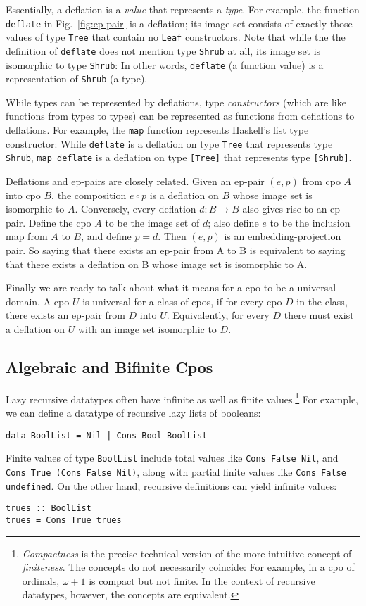 \documentclass{llncs}
\begin{document}
Essentially, a deflation is a \emph{value} that represents a
\emph{type}.  For example, the function \texttt{deflate} in
Fig.~\ref{fig:ep-pair} is a deflation; its image set consists of
exactly those values of type \texttt{Tree} that contain no
\texttt{Leaf} constructors.  Note that while the the definition of
\texttt{deflate} does not mention type \texttt{Shrub} at all, its
image set is isomorphic to type \texttt{Shrub}: In other words,
\texttt{deflate} (a function value) is a representation of
\texttt{Shrub} (a type).

While types can be represented by deflations, type \emph{constructors}
(which are like functions from types to types) can be represented as
functions from deflations to deflations.  For example, the
\texttt{map} function represents Haskell's list type constructor:
While \texttt{deflate} is a deflation on type \texttt{Tree} that
represents type \texttt{Shrub}, \texttt{map deflate} is a deflation on
type \texttt{[Tree]} that represents type \texttt{[Shrub]}.

Deflations and ep-pairs are closely related.  Given an ep-pair $(e, p)$
from cpo $A$ into cpo $B$, the composition $e \circ p$ is a deflation
on $B$ whose image set is isomorphic to $A$.  Conversely, every
deflation $d : B \rightarrow B$ also gives rise to an ep-pair.  Define
the cpo $A$ to be the image set of $d$; also define $e$ to be the
inclusion map from $A$ to $B$, and define $p = d$.  Then $(e, p)$ is
an embedding-projection pair.  So saying that there exists an ep-pair
from A to B is equivalent to saying that there exists a deflation on B
whose image set is isomorphic to A.

Finally we are ready to talk about what it means for a cpo to be a
universal domain.  A cpo $U$ is universal for a class of cpos, if for
every cpo $D$ in the class, there exists an ep-pair from $D$ into $U$.
Equivalently, for every $D$ there must exist a deflation on $U$ with
an image set isomorphic to $D$.

\subsection{Algebraic and Bifinite Cpos}

Lazy recursive datatypes often have infinite as well as finite
values.\footnote{\emph{Compactness} is the precise technical version
  of the more intuitive concept of \emph{finiteness}.  The concepts do
  not necessarily coincide: For example, in a cpo of ordinals, $\omega
  + 1$ is compact but not finite.  In the context of recursive
  datatypes, however, the concepts are equivalent.}  For example, we
can define a datatype of recursive lazy lists of booleans:
\begin{verbatim}
data BoolList = Nil | Cons Bool BoolList
\end{verbatim}
Finite values of type \texttt{BoolList} include total values like
\texttt{Cons False Nil}, and \texttt{Cons True (Cons False Nil)},
along with partial finite values like \texttt{Cons False undefined}.
On the other hand, recursive definitions can yield infinite values:
\begin{verbatim}
trues :: BoolList
trues = Cons True trues
\end{verbatim}
\end{document}
